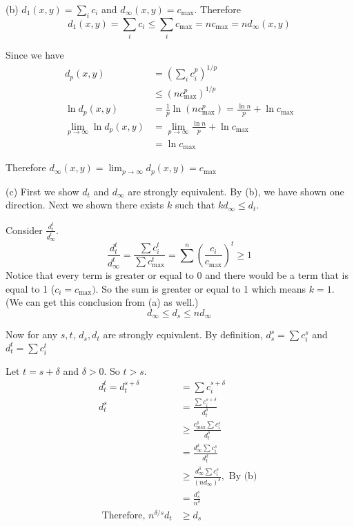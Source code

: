 \documentclass[12pt]{article}
\begin{document}
(b) $d_1(x,y) = \sum_i c_i$ and $d_{\infty} (x,y) = c_{\max}$. Therefore $$d_1(x,y) = \sum_i c_i \leq \sum_i c_{\max} = n c_{\max} = n d_{\infty} (x,y) $$ 
\QED

Since we have $$ \begin{aligned}
	d_p(x,y) &= (\sum_i c_i^p)^{1/p} \\
			& \leq (n c_{\max}^p )^{1/p} \\
	\ln d_p(x,y) &= \frac{1}{p} \ln (n c_{\max}^p) = \frac{\ln n}{p} + \ln c_{\max} \\
	\lim_{p \rightarrow \infty}	\ln d_p(x,y) &= \lim_{p \rightarrow \infty} \frac{\ln n}{p} + \ln c_{\max}  \\
	  &= \ln c_{\max}
\end{aligned}
$$

Therefore $d_{\infty} (x,y) = \lim_{p \rightarrow \infty} d_p(x,y) = c_{\max}$ \QED

(c) First we show $d_t$ and $d_{\infty}$ are strongly equivalent. By (b), we have shown one direction. Next we shown there exists $k$ such that $k d_{\infty} \leq d_t$.

Consider $\frac{d_t^t}{d_{\infty}^t}$.
 $$\frac{d_t^t}{d_{\infty}^t} = \frac{\sum c_i^t}{\sum c_{\max}^t} = \sum^n \left( \frac{c_i}{c_{\max}} \right)^t \geq 1$$ Notice that every term is greater or equal to $0$ and there would be a term that is equal to 1 ($c_i = c_{\max})$. So the sum is greater or equal to 1 which means $k = 1$. (We can get this conclusion from (a) as well.) 
 $$ d_{\infty} \leq d_s \leq n d_{\infty}$$
\QED

Now for any $s, t$, $d_s, d_t$ are strongly equivalent. 
By definition, $d_s^s = \sum c_i^s$ and $d_t^t = \sum c_i^t$

Let $t = s + \delta$ and $\delta > 0$. So $t > s$.
$$ 
\begin{aligned}
d_t^t = d_t^{s + \delta} &= \sum c_i^{s+ \delta}  \\
d_t^s &= \frac{ \sum c_i^{s+ \delta}}{d_t^{\delta}} \\
& \geq \frac{c_{\max}^\delta \sum c_i^{s}}{d_t^{\delta}} \\ 
& = \frac{d_{\infty}^\delta \sum c_i^{s}}{d_t^{\delta}} \\
& \geq \frac{d_{\infty}^\delta \sum c_i^{s}}{(n d_{\infty})^{\delta}}, \mbox{ By (b) } \\
& = \frac{d_s^s}{n^{\delta}} \\
\mbox{ Therefore, } n^{\delta/s} d_t &\geq d_s
\end{aligned}$$
\end{document}
